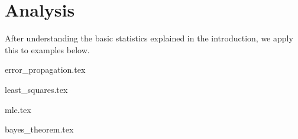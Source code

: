 \section{Analysis}
\label{sec:analysis}
After understanding the basic statistics explained in the introduction, we apply this to examples below.


{error_propagation.tex}

{least_squares.tex}

{mle.tex}

{bayes_theorem.tex}